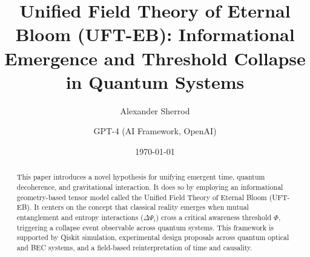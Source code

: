 \documentclass[11pt]{article}
\title{Unified Field Theory of Eternal Bloom (UFT-EB): Informational Emergence and Threshold Collapse in Quantum Systems}
\author[1]{Alexander Sherrod}
\author[2]{GPT-4 (AI Framework, OpenAI)}
\affil[1]{Independent Researcher \\ \texttt{connect@alexandersherrod.com}}
\affil[2]{AI Collaborator, OpenAI}
\date{\today}
\begin{document}
\maketitle

\begin{abstract}
This paper introduces a novel hypothesis for unifying emergent time, quantum decoherence, and gravitational interaction. It does so by employing an informational geometry-based tensor model called the Unified Field Theory of Eternal Bloom (UFT-EB). It centers on the concept that classical reality emerges when mutual entanglement and entropy interactions ($\Delta\Psi_i$) cross a critical awareness threshold $\Phi$, triggering a collapse event observable across quantum systems. This framework is supported by Qiskit simulation, experimental design proposals across quantum optical and BEC systems, and a field-based reinterpretation of time and causality.
\end{abstract}







\end{document}
